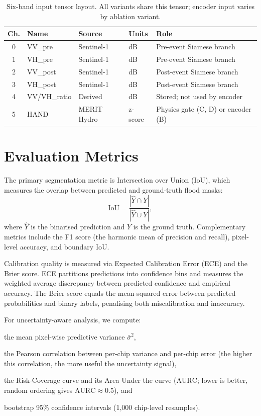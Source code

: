\documentclass[12pt,oneside]{report}
\newcommand{\IoU}{\mathrm{IoU}}
\newcommand{\AURC}{\mathrm{AURC}}
\begin{document}
\begin{table}[htbp]
\centering
\caption{Six-band input tensor layout.  All variants share this tensor;
encoder input varies by ablation variant.}
\label{tab:bands}
\begin{tabular}{cllll}
\toprule
\textbf{Ch.} & \textbf{Name} & \textbf{Source} & \textbf{Units} & \textbf{Role} \\
\midrule
0 & VV\_pre    & Sentinel-1  & dB      & Pre-event Siamese branch \\
1 & VH\_pre    & Sentinel-1  & dB      & Pre-event Siamese branch \\
2 & VV\_post   & Sentinel-1  & dB      & Post-event Siamese branch \\
3 & VH\_post   & Sentinel-1  & dB      & Post-event Siamese branch \\
4 & VV/VH\_ratio & Derived   & dB      & Stored; not used by encoder \\
5 & HAND       & MERIT Hydro & z-score & Physics gate (C, D) or encoder (B) \\
\bottomrule
\end{tabular}
\end{table}

\section{Evaluation Metrics}

The primary segmentation metric is Intersection over Union (IoU), which
measures the overlap between predicted and ground-truth flood masks:
\begin{equation}
  \IoU = \frac{|\hat{Y} \cap Y|}{|\hat{Y} \cup Y|},
  \label{eq:iou}
\end{equation}
where $\hat{Y}$ is the binarised prediction and $Y$ is the ground truth.
Complementary metrics include the F1 score (the harmonic mean of precision and
recall), pixel-level accuracy, and boundary IoU.

Calibration quality is measured via Expected Calibration Error (ECE) and the
Brier score.
ECE partitions predictions into confidence bins and measures the weighted
average discrepancy between predicted confidence and empirical accuracy.
The Brier score equals the mean-squared error between predicted probabilities
and binary labels, penalising both miscalibration and inaccuracy.

For uncertainty-aware analysis, we compute:
\begin{enumerate*}[label=(\roman*)]
  \item the mean pixel-wise predictive variance $\bar{\sigma}^2$,
  \item the Pearson correlation between per-chip variance and per-chip error
        (the higher this correlation, the more useful the uncertainty signal),
  \item the Risk-Coverage curve and its Area Under the curve ($\AURC$;
        lower is better, random ordering gives $\AURC \approx 0.5$), and
  \item bootstrap 95\% confidence intervals (1{,}000 chip-level resamples).
\end{enumerate*}
\end{document}
